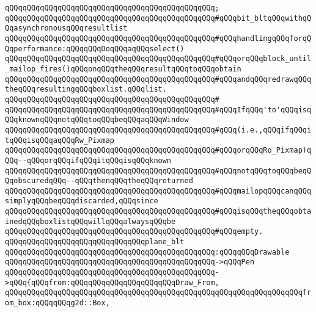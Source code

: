 \verb|qQQqqQQqqQQqqQQqqQQqqQQqqQQqqQQqqQQqqQQqqQQqqQQq;|\newline
\verb|qQQqqQQqqQQqqQQqqQQqqQQqqQQqqQQqqQQqqQQqqQQqqQQq#qQQqbit_bltqQQqwithqQQqasynchronousqQQqresultlist|\newline
\verb|qQQqqQQqqQQqqQQqqQQqqQQqqQQqqQQqqQQqqQQqqQQqqQQq#qQQqhandlingqQQqforqQQqperformance:qQQqqQQqDoqQQqaqQQqselect()|\newline
\verb|qQQqqQQqqQQqqQQqqQQqqQQqqQQqqQQqqQQqqQQqqQQqqQQq#qQQqorqQQqblock_until_mailop_fires()qQQqonqQQqtheqQQqresultqQQqtoqQQqobtain|\newline
\verb|qQQqqQQqqQQqqQQqqQQqqQQqqQQqqQQqqQQqqQQqqQQqqQQq#qQQqandqQQqredrawqQQqtheqQQqresultingqQQqboxlist.qQQqlist.|\newline
\verb|qQQqqQQqqQQqqQQqqQQqqQQqqQQqqQQqqQQqqQQqqQQqqQQq#|\newline
\verb|qQQqqQQqqQQqqQQqqQQqqQQqqQQqqQQqqQQqqQQqqQQqqQQq#qQQqIfqQQq'to'qQQqisqQQqknownqQQqnotqQQqtoqQQqbeqQQqaqQQqWindow|\newline
\verb|qQQqqQQqqQQqqQQqqQQqqQQqqQQqqQQqqQQqqQQqqQQqqQQq#qQQq(i.e.,qQQqifqQQqitqQQqisqQQqaqQQqRw_Pixmap|\newline
\verb|qQQqqQQqqQQqqQQqqQQqqQQqqQQqqQQqqQQqqQQqqQQqqQQq#qQQqorqQQqRo_Pixmap)qQQq--qQQqorqQQqifqQQqitqQQqisqQQqknown|\newline
\verb|qQQqqQQqqQQqqQQqqQQqqQQqqQQqqQQqqQQqqQQqqQQqqQQq#qQQqnotqQQqtoqQQqbeqQQqobscuredqQQq--qQQqthenqQQqtheqQQqreturned|\newline
\verb|qQQqqQQqqQQqqQQqqQQqqQQqqQQqqQQqqQQqqQQqqQQqqQQq#qQQqmailopqQQqcanqQQqsimplyqQQqbeqQQqdiscarded,qQQqsince|\newline
\verb|qQQqqQQqqQQqqQQqqQQqqQQqqQQqqQQqqQQqqQQqqQQqqQQq#qQQqisqQQqtheqQQqobtainedqQQqboxlistqQQqwillqQQqalwaysqQQqbe|\newline
\verb|qQQqqQQqqQQqqQQqqQQqqQQqqQQqqQQqqQQqqQQqqQQqqQQq#qQQqempty.|\newline
\newline
\verb|qQQqqQQqqQQqqQQqqQQqqQQqqQQqqQQqplane_blt|\newline
\verb|qQQqqQQqqQQqqQQqqQQqqQQqqQQqqQQqqQQqqQQqqQQqqQQq:qQQqqQQqDrawable|\newline
\verb|qQQqqQQqqQQqqQQqqQQqqQQqqQQqqQQqqQQqqQQqqQQqqQQq->qQQqPen|\newline
\verb|qQQqqQQqqQQqqQQqqQQqqQQqqQQqqQQqqQQqqQQqqQQqqQQq->qQQq{qQQqfrom:qQQqqQQqqQQqqQQqqQQqqQQqDraw_From,|\newline
\verb|qQQqqQQqqQQqqQQqqQQqqQQqqQQqqQQqqQQqqQQqqQQqqQQqqQQqqQQqqQQqqQQqqQQqfrom_box:qQQqqQQqg2d::Box,|\newline
